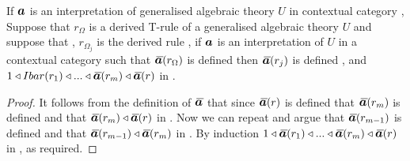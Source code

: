 \begin{lemma}
If $\iI$ is an interpretation of generalised algebraic theory $U$ in contextual category \catc,
Suppose that  $r_\Omega$ is a derived T-rule \ZOmega of a generalised algebraic theory $U$
and suppose that \foreachj, $r_{\Omega_j}$ is the derived rule
,
if $\iI$ is an interpretation of $U$ in a contextual category \catcw
such that $\Ibar(r_\Omega)$ is defined then
$\Ibar(r_j)$ is defined \foreachj, and 
$1 \base Ibar(r_1) \base  ... \base \Ibar(r_m) \base \Ibar(r)$ in \catc.
\end{lemma}
\begin{proof}
It follows from the definition of $\Ibar$ that since $\Ibar(r)$ is defined that $\Ibar(r_m)$ is defined and that
$\Ibar(r_m) \base \Ibar(r)$ in \catc. Now we can repeat and argue that $\Ibar(r_{m-1})$ is defined and that $\Ibar(r_{m-1}) \base \Ibar(r_m)$
in \catc. By induction $1 \base \Ibar(r_1) \base  ... \base \Ibar(r_m) \base \Ibar(r)$ in \catc, as required. 
\end{proof}


